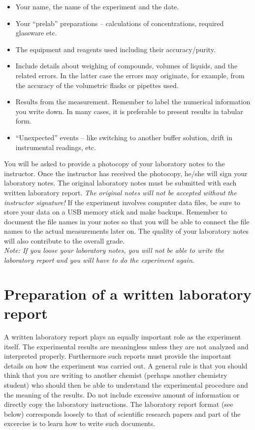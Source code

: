 \documentclass[byrevtex,amssymb,aps,pra,floatfix,letterpaper]{revtex4}
\begin{document}
\begin{itemize}
\item Your name, the name of the experiment and the date.
\item Your ``prelab'' preparations -- calculations of concentrations, required glassware etc.
\item The equipment and reagents used including their accuracy/purity.
\item Include details about weighing of compounds, volumes of liquids, and the related errors. In the latter case the errors may originate, for example, from the accuracy of the volumetric flasks or pipettes used.
\item Results from the measurement. Remember to label the numerical information you write down. In many cases, it is preferable to present results in tabular form.
\item ``Unexpected'' events -- like switching to another buffer solution, drift in instrumental readings, etc.
\end{itemize}

\noindent
You will be asked to provide a photocopy of your laboratory notes to the instructor. Once the instructor has received the photocopy, he/she will sign your laboratory notes. The original laboratory notes must be submitted with each written laboratory report. \textit{The original notes will not be accepted without the instructor signature!} If the experiment involves computer data files, be sure to store your data on a USB memory stick and make backups. Remember to document the file names in your notes so that you will be able to connect the file names to the actual measurements later on. The quality of your laboratory notes will also contribute to the overall grade.\\

\noindent
\textit{Note: If you loose your laboratory notes, you will not be able to write the laboratory report and you will have to do the experiment again}. 

\section{Preparation of a written laboratory report}
\label{sec4}

A written laboratory report plays an equally important role as the experiment itself. The experimental results are meaningless unless they are not analyzed and interpreted properly. Furthermore such reports must provide the important details on how the experiment was carried out. A general rule is that you should think that you are writing to another chemist (perhaps another chemistry student) who should then be able to understand the experimental procedure and the meaning of the results. Do not include excessive amount of information or directly copy the laboratory instructions. The laboratory report format (see below) corresponds loosely to that of scientific research papers and part of the excercise is to learn how to write such documents.
\end{document}
